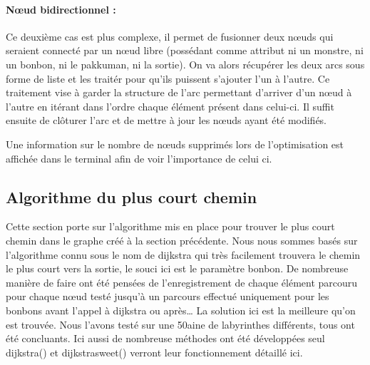 \documentclass[12pt, oneside]{article}
\begin{document}
\paragraph{Nœud bidirectionnel :}
Ce deuxième cas est plus complexe, il permet de fusionner deux nœuds qui seraient connecté par un nœud libre (possédant comme attribut ni un monstre, ni un bonbon, ni le pakkuman, ni la sortie). 
On va alors récupérer les deux arcs sous forme de liste et les traitér pour qu’ils puissent s’ajouter l’un à l’autre. Ce traitement vise à garder la structure de l’arc permettant d’arriver d’un nœud à l’autre en itérant dans l’ordre chaque élément présent dans celui-ci.
Il suffit ensuite de clôturer l’arc et de mettre à jour les nœuds ayant été modifiés.

Une information sur le nombre de nœuds supprimés lors de l’optimisation est affichée dans le terminal afin de voir l’importance de celui ci.

\subsection{Algorithme du plus court chemin}
Cette section porte sur l’algorithme mis en place pour trouver le plus court chemin dans le graphe créé à la section précédente. Nous nous sommes basés sur l’algorithme connu sous le nom de dijkstra qui très facilement trouvera le chemin le plus court vers la sortie, le souci ici est le paramètre bonbon. De nombreuse manière de faire ont été pensées de l’enregistrement de chaque élément parcouru pour chaque nœud testé jusqu’à un parcours effectué uniquement pour les bonbons avant l’appel à dijkstra ou après… La solution ici est la meilleure qu’on est trouvée. Nous l’avons testé sur une 50aine de labyrinthes différents, tous ont été concluants.
Ici aussi de nombreuse méthodes ont été développées seul dijkstra() et dijkstra\textunderscore sweet() verront leur fonctionnement détaillé ici. 
\end{document}
